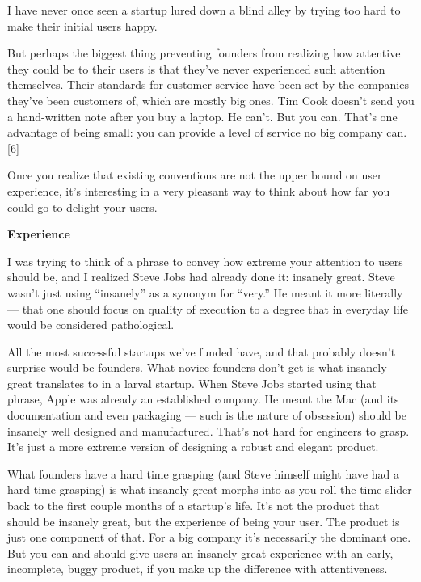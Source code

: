 I have never once seen a startup lured down a blind alley by trying too
hard to make their initial users happy.

But perhaps the biggest thing preventing founders from realizing how
attentive they could be to their users is that they've never experienced
such attention themselves. Their standards for customer service have
been set by the companies they've been customers of, which are mostly
big ones. Tim Cook doesn't send you a hand-written note after you buy a
laptop. He can't. But you can. That's one advantage of being small: you
can provide a level of service no big company can.
{[}\hyperref[f6n]{6}{]}

Once you realize that existing conventions are not the upper bound on
user experience, it's interesting in a very pleasant way to think about
how far you could go to delight your users.

\textbf{Experience}

I was trying to think of a phrase to convey how extreme your attention
to users should be, and I realized Steve Jobs had already done it:
insanely great. Steve wasn't just using ``insanely'' as a synonym for
``very.'' He meant it more literally --- that one should focus on
quality of execution to a degree that in everyday life would be
considered pathological.

All the most successful startups we've funded have, and that probably
doesn't surprise would-be founders. What novice founders don't get is
what insanely great translates to in a larval startup. When Steve Jobs
started using that phrase, Apple was already an established company. He
meant the Mac (and its documentation and even packaging --- such is the
nature of obsession) should be insanely well designed and manufactured.
That's not hard for engineers to grasp. It's just a more extreme version
of designing a robust and elegant product.

What founders have a hard time grasping (and Steve himself might have
had a hard time grasping) is what insanely great morphs into as you roll
the time slider back to the first couple months of a startup's life.
It's not the product that should be insanely great, but the experience
of being your user. The product is just one component of that. For a big
company it's necessarily the dominant one. But you can and should give
users an insanely great experience with an early, incomplete, buggy
product, if you make up the difference with attentiveness.

